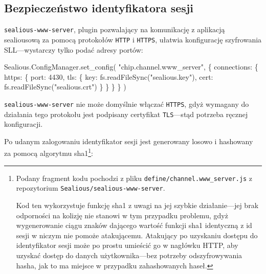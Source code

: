 \documentclass[12pt,polish,a4paper,]{report}
\newenvironment{Shaded}{}{}
\newcommand{\DataTypeTok}[1]{\textcolor[rgb]{0.56,0.13,0.00}{{#1}}}
\newcommand{\DecValTok}[1]{\textcolor[rgb]{0.25,0.63,0.44}{{#1}}}
\newcommand{\StringTok}[1]{\textcolor[rgb]{0.25,0.44,0.63}{{#1}}}
\newcommand{\VariableTok}[1]{\textcolor[rgb]{0.10,0.09,0.49}{{#1}}}
\newcommand{\OperatorTok}[1]{\textcolor[rgb]{0.40,0.40,0.40}{{#1}}}
\newcommand{\AttributeTok}[1]{\textcolor[rgb]{0.49,0.56,0.16}{{#1}}}
\newcommand{\NormalTok}[1]{{#1}}
\begin{document}
\subsection{Bezpieczeństwo identyfikatora
sesji}\label{bezpieczeux144stwo-identyfikatora-sesji}

\texttt{sealious-www-server}, plugin pozwalający na komunikację z
aplikacją sealiousową za pomocą protokołów \texttt{HTTP} i
\texttt{HTTPS}, ułatwia konfigurację szyfrowania SLL---wystarczy tylko
podać adresy portów:

\begin{Shaded}
\begin{Highlighting}[]
\VariableTok{Sealious}\NormalTok{.}\VariableTok{ConfigManager}\NormalTok{.}\AttributeTok{set_config}\NormalTok{(}
    \StringTok{"chip.channel.www_server"}\OperatorTok{,} \OperatorTok{\{}
        \DataTypeTok{connections}\OperatorTok{:} \OperatorTok{\{}
            \DataTypeTok{https}\OperatorTok{:} \OperatorTok{\{}
                \DataTypeTok{port}\OperatorTok{:} \DecValTok{4430}\OperatorTok{,}
                \DataTypeTok{tls}\OperatorTok{:} \OperatorTok{\{}
                    \DataTypeTok{key}\OperatorTok{:} \VariableTok{fs}\NormalTok{.}\AttributeTok{readFileSync}\NormalTok{(}\StringTok{"sealious.key"}\NormalTok{)}\OperatorTok{,}
                    \DataTypeTok{cert}\OperatorTok{:} \VariableTok{fs}\NormalTok{.}\AttributeTok{readFileSync}\NormalTok{(}\StringTok{"sealious.crt"}\NormalTok{)}
                \OperatorTok{\}}
            \OperatorTok{\}}
        \OperatorTok{\}}
    \OperatorTok{\}}
\NormalTok{)}
\end{Highlighting}
\end{Shaded}

\texttt{sealious-www-server} nie może domyślnie włączać \texttt{HTTPS},
gdyż wymagany do działania tego protokołu jest podpisany certyfikat
\texttt{TLS}---stąd potrzeba ręcznej konfiguracji.

Po udanym zalogowaniu identyfikator sesji jest generowany losowo i
hashowany za pomocą algorytmu sha1\footnote{Podany fragment kodu
  pochodzi z pliku \texttt{define/channel.www\_server.js} z repozytorium
  \texttt{Sealious/sealious-www-server}.

  Kod ten wykorzystuje funkcję sha1 z uwagi na jej szybkie
  działanie---jej brak odporności na kolizję nie stanowi w tym przypadku
  problemu, gdyż wygenerowanie ciągu znaków dającego wartość funkcji
  sha1 identyczną z id sesji w niczym nie pomoże atakującemu. Atakujący
  po uzyskaniu dostępu do identyfikator sesji może po prostu umieścić go
  w nagłówku HTTP, aby uzyskać dostęp do danych użytkownika---bez
  potrzeby odszyfrowywania hasha, jak to ma miejsce w przypadku
  zahashowanych haseł.}:
\end{document}
